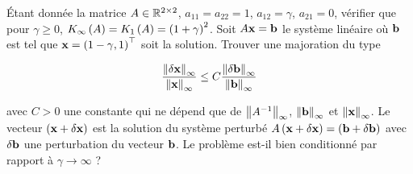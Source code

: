 Étant donnée la matrice $A \in \mathbb{R}^{2 \times 2}$, $a_{11} = a_{22} = 1$, $a_{12} = \gamma$, $a_{21} = 0$, vérifier que pour $\gamma \geq 0$, $K_{\infty} \left(A\right) = K_{1} \left(A\right) = \left(1 + \gamma\right)^{2}$.
Soit $A \mathbf{x} = \mathbf{b}$ le système linéaire où $\mathbf{b}$ est tel que $\mathbf{x} = \left(1 - \gamma, 1\right)^{\top}$ soit la solution.
Trouver une majoration du type 

\begin{equation*}
  \dfrac{\left\lVert\delta \mathbf{x}\right\rVert_{\infty}}{\left\lVert\mathbf{x}\right\rVert_{\infty}}
  \leq C \dfrac{\left\lVert\delta \mathbf{b}\right\rVert_{\infty}}{\left\lVert\mathbf{b}\right\rVert_{\infty}}
\end{equation*}

avec $C > 0$ une constante qui ne dépend que de $\left\lVert A^{-1}\right\rVert_{\infty}$, $\left\lVert\mathbf{b}\right\rVert_{\infty}$ et $\left\lVert\mathbf{x}\right\rVert_{\infty}$.
Le vecteur $\left(\mathbf{x} + \delta \mathbf{x}\right)$ est la solution du système perturbé $A \left(\mathbf{x} + \delta \mathbf{x}\right) = \left(\mathbf{b} + \delta \mathbf{b}\right)$ avec $\delta \mathbf{b}$ une perturbation du vecteur $\mathbf{b}$.
Le problème est-il bien conditionné par rapport à $\gamma \rightarrow \infty$ ?